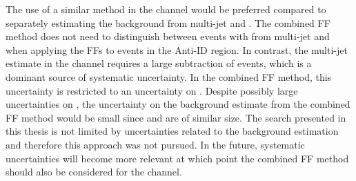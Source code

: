 The use of a similar method in the \hadhad channel would be preferred compared
to separately estimating the \faketauhadvisC background from multi-jet and
\ttbar. The combined FF method does not need to distinguish between events with
\faketauhadvis from multi-jet and \ttbar when applying the FFs to events in the
Anti-ID region. In contrast, the multi-jet estimate in the \hadhad channel
requires a large subtraction of \ttbarFakes events, which is a dominant source
of systematic uncertainty. In the combined FF method, this uncertainty is
restricted to an uncertainty on \rqcd. Despite possibly large uncertainties on
\rqcd, the uncertainty on the \faketauhadvisC background estimate from the
combined FF method would be small since \FFqcd and \FFttbar are of similar
size. The search presented in this thesis is not limited by uncertainties
related to the \faketauhadvisC background estimation and therefore this approach
was not pursued. In the future, systematic uncertainties will become more
relevant at which point the combined FF method should also be considered for the
\hadhad channel.



